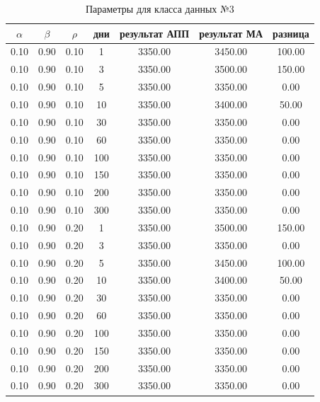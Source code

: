 \begin{table}[H]
    \centering
    \caption{Параметры для класса данных №3}
    \label{tab:class_3}
    \begin{tabular}{|c|c|c|c|c|c|c|}
        \hline
        $\alpha$ & $\beta$ & $\rho$ & дни & результат АПП & результат МА & разница \\
        \hline
  0.10 &   0.90 &   0.10 &      1 &    3350.00 &    3450.00 &     100.00  \\
  0.10 &   0.90 &   0.10 &      3 &    3350.00 &    3500.00 &     150.00  \\
  0.10 &   0.90 &   0.10 &      5 &    3350.00 &    3350.00 &       0.00  \\
  0.10 &   0.90 &   0.10 &     10 &    3350.00 &    3400.00 &      50.00  \\
  0.10 &   0.90 &   0.10 &     30 &    3350.00 &    3350.00 &       0.00  \\
  0.10 &   0.90 &   0.10 &     60 &    3350.00 &    3350.00 &       0.00  \\
  0.10 &   0.90 &   0.10 &    100 &    3350.00 &    3350.00 &       0.00  \\
  0.10 &   0.90 &   0.10 &    150 &    3350.00 &    3350.00 &       0.00  \\
  0.10 &   0.90 &   0.10 &    200 &    3350.00 &    3350.00 &       0.00  \\
  0.10 &   0.90 &   0.10 &    300 &    3350.00 &    3350.00 &       0.00  \\
  0.10 &   0.90 &   0.20 &      1 &    3350.00 &    3500.00 &     150.00  \\
  0.10 &   0.90 &   0.20 &      3 &    3350.00 &    3350.00 &       0.00  \\
  0.10 &   0.90 &   0.20 &      5 &    3350.00 &    3450.00 &     100.00  \\
  0.10 &   0.90 &   0.20 &     10 &    3350.00 &    3400.00 &      50.00  \\
  0.10 &   0.90 &   0.20 &     30 &    3350.00 &    3350.00 &       0.00  \\
  0.10 &   0.90 &   0.20 &     60 &    3350.00 &    3350.00 &       0.00  \\
  0.10 &   0.90 &   0.20 &    100 &    3350.00 &    3350.00 &       0.00  \\
  0.10 &   0.90 &   0.20 &    150 &    3350.00 &    3350.00 &       0.00  \\
  0.10 &   0.90 &   0.20 &    200 &    3350.00 &    3350.00 &       0.00  \\
  0.10 &   0.90 &   0.20 &    300 &    3350.00 &    3350.00 &       0.00  \\

\end{tabular}
\end{table}
